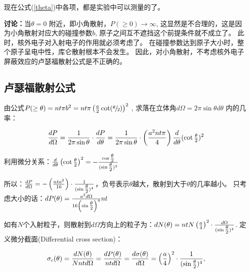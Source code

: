 现在公式(\ref{theta})中各项，都是实验中可以测量的了。


{\bf 讨论：}当$\theta  = 0$ 附近，即小角散射，$P( \ge 0) \to \infty
$, 这显然是不合理的，这是因为小角散射对应大的碰撞参数$b$,
原子之间互不遮挡这个前提条件就不成立了。
此时，核外电子对入射电子的作用就必须考虑了。
在碰撞参数达到原子大小时，整个原子呈电中性，库仑散射根本不会发生。
因此，对小角散射，不考虑核外电子屏蔽效应的卢瑟福散射公式是不正确的。

\subsection{卢瑟福散射公式}

由公式$P( \ge \theta ) = nt\pi b^2  = nt\pi \left( {{\textstyle{a
\over 2}}\cot ({\raise0.5ex\hbox{$\scriptstyle \theta $}
\kern-0.1em/\kern-0.15em \lower0.25ex\hbox{$\scriptstyle 2$}})}
\right)^2 $ , 求落在立体角$d\Omega  = 2\pi \sin \theta d\theta $
内的几率：

\begin{equation}
\frac{{dP}}{{d\Omega }} = \frac{1}{{2\pi \sin \theta }} \cdot
\frac{{dP}}{{d\theta }} = \frac{1}{{2\pi \sin \theta }} \cdot
\left( {\frac{{a^2 nt\pi }}{4}} \right)\frac{d}{{d\theta }}(\cot
{\textstyle{\theta  \over 2}})^2 
\end{equation}

利用微分关系：$\frac{d}{{d\theta }}\left( {\cot {\textstyle{\theta
\over 2}}} \right)^2  =  - \frac{{\cos {\textstyle{\theta  \over
2}}}}{{(\sin {\textstyle{\theta  \over 2}})^3 }}$


所以：$\frac{{dP}}{{d\Omega }} =  - \left( {\frac{{nta^2 }}{{16}}}
\right) \cdot \frac{1}{{(\sin {\textstyle{\theta  \over 2}})^4
}}$，负号表示$\theta $越大，散射到大于$\theta $的几率越小。
只考虑大小的话：$dP(\theta ) = \frac{{a^2 d\Omega }}{{16\left( {\sin
{\textstyle{\theta  \over 2}}} \right)^4 }}nt$


如有$N$个入射粒子，则散射到$d \Omega $方向上的粒子为：$dN(\theta ) =
ntN\left( {\frac{a}{4}} \right)^2  \cdot \frac{{d\Omega }}{{(\sin
{\textstyle{\theta  \over 2}})^4 }}$. 定义微分截面(Differential
cross section)：


\begin{equation}\label{differential cross section formula}
\sigma _c (\theta ) = \frac{{dN(\theta )}}{{Nntd\Omega }} =
\frac{{dP(\theta )}}{{ntd\Omega }} = \frac{{d\sigma (\theta
)}}{{d\Omega }} = \left( {\frac{a}{4}} \right)^2  \cdot
\frac{1}{{(\sin {\textstyle{\theta  \over 2}})^4 }},
\end{equation}

